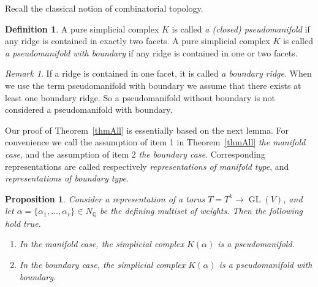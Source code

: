\documentclass[english,12pt,oneside]{amsproc}
\DeclareMathOperator{\GL}{GL}
\newcommand{\Qo}{\mathbb{Q}}
\newcommand{\Nq}{N_\Qo}
\newcounter{stmcounter}[section]
\numberwithin{equation}{section}
\theoremstyle{plain}
\newtheorem{prop}[stmcounter]{Proposition}
\theoremstyle{definition}
\newtheorem{defin}[stmcounter]{Definition}
\theoremstyle{remark}
\newtheorem{rem}[stmcounter]{Remark}
\begin{document}
Recall the classical notion of combinatorial topology.

\begin{defin}\label{definPseudomfd}
A pure simplicial complex $K$ is called \emph{a (closed) pseudomanifold} if any ridge is contained in exactly two facets. A pure simplicial complex $K$ is called \emph{a pseudomanifold with boundary} if any ridge is contained in one or two facets.
\end{defin}

\begin{rem}
If a ridge is contained in one facet, it is called \emph{a boundary ridge}. When we use the term pseudomanifold with boundary we assume that there exists at least one boundary ridge. So a pseudomanifold without boundary is not considered a pseudomanifold with boundary.
\end{rem}

Our proof of Theorem~\ref{thmAll} is essentially based on the next lemma. For convenience we call the assumption of item 1 in  Theorem~\ref{thmAll} \emph{the manifold case}, and the assumption of item 2 \emph{the boundary case}. Corresponding representations are called respectively \emph{representations of manifold type}, and \emph{representations of boundary type}.

\begin{prop}\label{propMfdPseudomfd}
Consider a representation of a torus $T=T^k\to\GL(V)$, and let $\alpha=\{\alpha_1,\ldots,\alpha_r\}\in\Nq$ be the defining multiset of weights. Then the following hold true.
\begin{enumerate}
  \item In the manifold case, the simplicial complex $K(\alpha)$ is a pseudomanifold.
  \item In the boundary case, the simplicial complex $K(\alpha)$ is a pseudomanifold with boundary.
\end{enumerate}
\end{prop}
\end{document}
